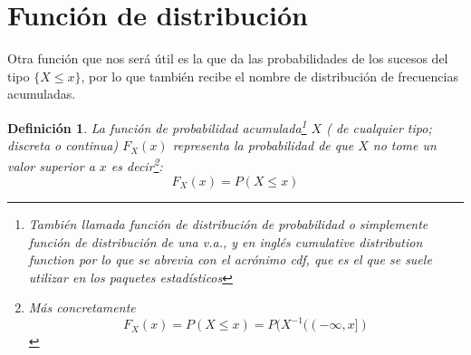 \documentclass[12pt]{report}
\newtheorem{definition}{Definici\'on}
\begin{document}
\section{Función de distribución} Otra función que nos será útil es la  que  da las
probabilidades de los sucesos del tipo $\{X\leq x\}$, por lo que también recibe el nombre
de distribución de frecuencias acumuladas.

\begin{definition}
La función de probabilidad acumulada\footnote{ También llamada función de distribución de
probabilidad o simplemente función de distribución de una v.a., y en inglés
\emph{cumulative distribution function} por lo que se abrevia con el acrónimo \emph{cdf},
que es el que se suele utilizar en los paquetes estadísticos} $X$ ( de cualquier tipo;
discreta o continua) $F_{X}(x)$ representa la probabilidad de que $X$ no tome un valor
superior a $x$ es decir\footnote{Más concretamente $$F_{X}(x)=P(X\leq
x)=P(X^{-1}((-\infty,x])$$}:
$$F_{X}(x)=P(X\leq x)$$
\end{definition}

\end{document}
